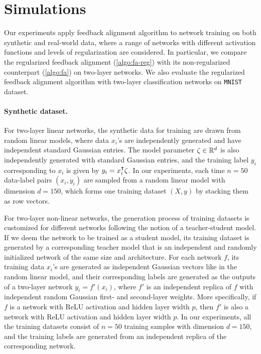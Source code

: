 \section{Simulations}

Our experiments apply feedback alignment algorithm to network training on both synthetic and real-world data, where a range of networks with different activation functions and levels of regularization are considered. In particular, we compare the regularized feedback alignment (\cref{algo:fa-reg}) with its non-regularized counterpart (\cref{algo:fa}) on two-layer networks. We also evaluate the regularized feedback alignment algorithm with two-layer classification networks on \texttt{MNIST} dataset.

\paragraph{Synthetic dataset.}

For two-layer linear networks, the synthetic data for training are drawn from random linear models, where data $x_i$'s are independently generated and have independent standard Gaussian entries. The model parameter $\zeta\in{\mathbb{R}^{d}}$ is also independently generated with standard Gaussian entries, and the training label $y_i$ corresponding to $x_i$ is given by $y_i = x_i\transpose \zeta$. In our experiments, each time $n = 50$ data-label pairs $(x_i,y_i)$ are sampled from a random linear model with dimension $d = 150$, which forms one training dataset $(X,y)$ by stacking them as row vectors.

For two-layer non-linear networks, the generation process of training datasets is customized for different networks following the notion of a teacher-student model. If we deem the network to be trained as a student model, its training dataset is generated by a corresponding teacher model that is an independent and randomly initialized network of the same size and architecture. For each network $f$, its training data $x_i$'s are generated as independent Gaussian vectors like in the random linear model, and their corresponding labels are generated as the outputs of a two-layer network $y_i = f'(x_i)$, where $f'$ is an independent replica of $f$ with independent random Gaussian first- and second-layer weights. More specifically, if $f$ is a network with ReLU activation and hidden layer width $p$, then $f'$ is also a network with ReLU activation and hidden layer width $p$. In our experiments, all the training datasets consist of $n = 50$ training samples with dimension $d = 150$, and the training labels are generated from an independent replica of the corresponding network.

